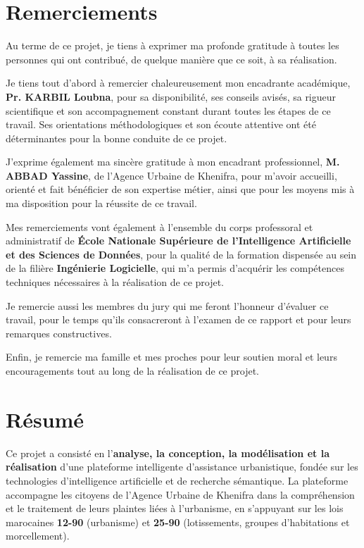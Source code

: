 \documentclass[12pt,a4paper]{report}
\newcommand{\nomencadrant}{Pr. KARBIL Loubna}
\newcommand{\nomencadrantentreprise}{M. ABBAD Yassine}
\newcommand{\etablissement}{École Nationale Supérieure de l'Intelligence Artificielle et des Sciences de Données}
\newcommand{\filiere}{Ingénierie Logicielle}
\begin{document}

\chapter*{Remerciements}

Au terme de ce projet, je tiens à exprimer ma profonde gratitude à toutes les personnes qui ont contribué, de quelque manière que ce soit, à sa réalisation.

Je tiens tout d'abord à remercier chaleureusement mon encadrante académique, \textbf{\nomencadrant}, pour sa disponibilité, ses conseils avisés, sa rigueur scientifique et son accompagnement constant durant toutes les étapes de ce travail. Ses orientations méthodologiques et son écoute attentive ont été déterminantes pour la bonne conduite de ce projet.

J'exprime également ma sincère gratitude à mon encadrant professionnel, \textbf{\nomencadrantentreprise}, de l'Agence Urbaine de Khenifra, pour m'avoir accueilli, orienté et fait bénéficier de son expertise métier, ainsi que pour les moyens mis à ma disposition pour la réussite de ce travail.

Mes remerciements vont également à l'ensemble du corps professoral et administratif de \textbf{\etablissement}, pour la qualité de la formation dispensée au sein de la filière \textbf{\filiere}, qui m'a permis d'acquérir les compétences techniques nécessaires à la réalisation de ce projet.

Je remercie aussi les membres du jury qui me feront l'honneur d'évaluer ce travail, pour le temps qu'ils consacreront à l'examen de ce rapport et pour leurs remarques constructives.

Enfin, je remercie ma famille et mes proches pour leur soutien moral et leurs encouragements tout au long de la réalisation de ce projet.

\chapter*{Résumé}

Ce projet a consisté en l'\textbf{analyse, la conception, la modélisation et la réalisation} d'une plateforme intelligente d'assistance urbanistique, fondée sur les technologies d'intelligence artificielle et de recherche sémantique. La plateforme accompagne les citoyens de l'Agence Urbaine de Khenifra dans la compréhension et le traitement de leurs plaintes liées à l'urbanisme, en s'appuyant sur les lois marocaines \textbf{12-90} (urbanisme) et \textbf{25-90} (lotissements, groupes d'habitations et morcellement).
\end{document}
